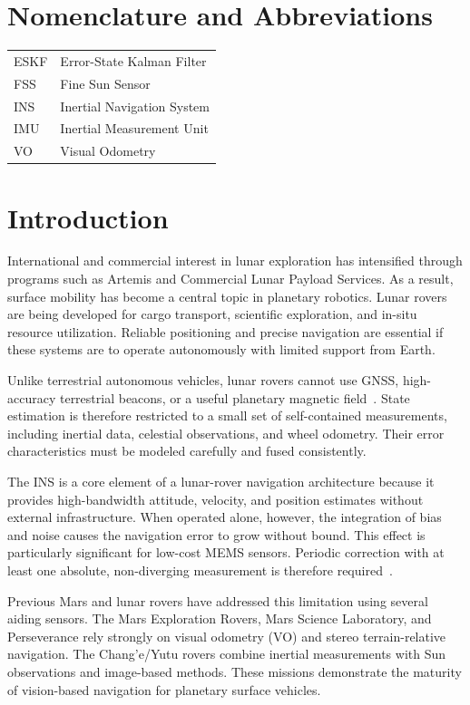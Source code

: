 \documentclass[]{IAC_style}
\begin{document}
\section*{Nomenclature and Abbreviations}
\begin{tabular}{@{}ll@{}}
ESKF & Error-State Kalman Filter \\
FSS & Fine Sun Sensor \\
INS & Inertial Navigation System \\
IMU & Inertial Measurement Unit \\
VO & Visual Odometry \\
\end{tabular}

\section{Introduction}

International and commercial interest in lunar exploration has intensified through programs such as Artemis and Commercial Lunar Payload Services. As a result, surface mobility has become a central topic in planetary robotics. Lunar rovers are being developed for cargo transport, scientific exploration, and in-situ resource utilization. Reliable positioning and precise navigation are essential if these systems are to operate autonomously with limited support from Earth.

Unlike terrestrial autonomous vehicles, lunar rovers cannot use GNSS, high-accuracy terrestrial beacons, or a useful planetary magnetic field~\cite{ilyas2016integrated}. State estimation is therefore restricted to a small set of self-contained measurements, including inertial data, celestial observations, and wheel odometry. Their error characteristics must be modeled carefully and fused consistently.

The INS is a core element of a lunar-rover navigation architecture because it provides high-bandwidth attitude, velocity, and position estimates without external infrastructure. When operated alone, however, the integration of bias and noise causes the navigation error to grow without bound. This effect is particularly significant for low-cost MEMS sensors. Periodic correction with at least one absolute, non-diverging measurement is therefore required~\cite{titterton2004strapdown,groves2013principles}.

Previous Mars and lunar rovers have addressed this limitation using several aiding sensors. The Mars Exploration Rovers, Mars Science Laboratory, and Perseverance rely strongly on visual odometry (VO) and stereo terrain-relative navigation. The Chang'e/Yutu rovers combine inertial measurements with Sun observations and image-based methods. These missions demonstrate the maturity of vision-based navigation for planetary surface vehicles.
\end{document}
